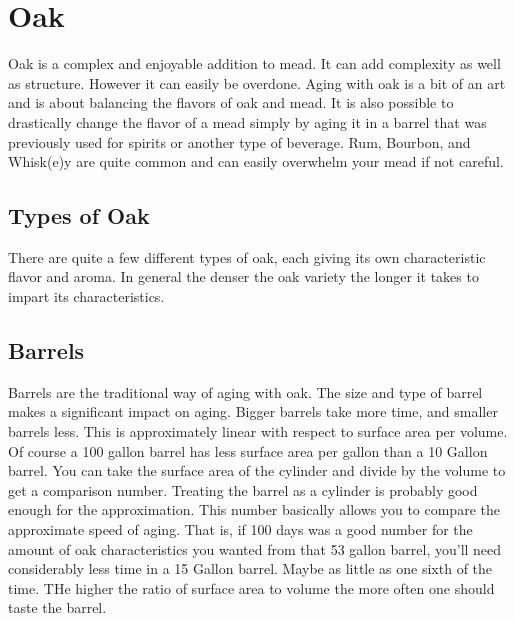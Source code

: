 \section{Oak}
  Oak is  a complex and enjoyable addition to mead. It can add complexity as well as structure. However it can easily
  be overdone. Aging with oak is a bit of an art and is about balancing the flavors of oak and mead. It is also
  possible to drastically change the flavor of a mead simply by aging it in a barrel that was previously used
  for spirits or another type of beverage. Rum, Bourbon, and Whisk(e)y are quite common and can easily overwhelm
  your mead if not careful.


 \subsection{Types of Oak}
  There are quite a few different types of oak, each giving its own characteristic flavor and aroma.
  In general the denser the oak variety the longer it takes to impart its characteristics. 

 \subsection{Barrels}
  Barrels are the traditional way of aging with oak. The size and type of barrel makes a significant impact on
  aging. Bigger barrels take more time, and smaller barrels less. This is approximately linear with respect to
  surface area per volume. Of course a 100 gallon barrel has less surface area per gallon than a 10 Gallon barrel.
  You can take the surface area of the cylinder and divide by the volume to get a comparison number. 
  Treating the barrel as a cylinder is probably good enough for the approximation.
  This number
  basically allows you to compare the approximate speed of aging. That is, if 100 days was a good number for the
  amount of oak characteristics you wanted from that 53 gallon barrel, you'll need considerably less time in a 
  15 Gallon barrel. Maybe as little as one sixth of the time. THe higher the ratio of surface area to volume the more 
  often one should taste the barrel.

